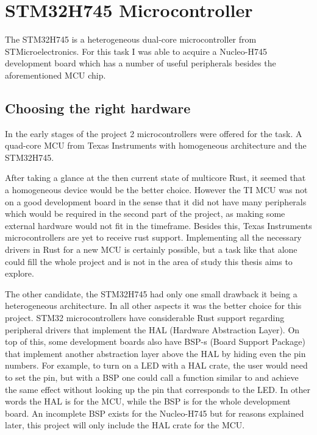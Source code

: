 \chapter{STM32H745 Microcontroller}

The STM32H745 is a heterogeneous dual-core microcontroller from STMicroelectronics. For this task I was able to acquire a Nucleo-H745 development board which has a number of useful peripherals besides the aforementioned MCU chip.

\section{Choosing the right hardware}

In the early stages of the project 2 microcontrollers were offered for the task. A quad-core MCU from Texas Instruments with homogeneous architecture and the STM32H745.

After taking a glance at the then current state of multicore Rust, it seemed that a homogeneous device would be the better choice. However the TI MCU was not on a good development board in the sense that it did not have many peripherals which would be required in the second part of the project, as making some external hardware would not fit in the timeframe. Besides this, Texas Instruments microcontrollers are yet to receive rust support. Implementing all the necessary drivers in Rust for a new MCU is certainly possible, but a task like that alone could fill the whole project and is not in the area of study this thesis aims to explore.

The other candidate, the STM32H745 had only one small drawback it being a heterogeneous architecture. In all other aspects it was the better choice for this project. STM32 microcontrollers have considerable Rust support regarding peripheral drivers that implement the HAL (Hardware Abstraction Layer). On top of this, some development boards also have BSP-s (Board Support Package) that implement another abstraction layer above the HAL by hiding even the pin numbers. For example, to turn on a LED with a HAL crate, the user would need to set the  pin, but with a BSP one could call a function similar to  and achieve the same effect without looking up the pin that corresponds to the LED. In other words the HAL is for the MCU, while the BSP is for the whole development board. An incomplete BSP exists for the Nucleo-H745 but for reasons explained later, this project will only include the HAL crate for the MCU.

